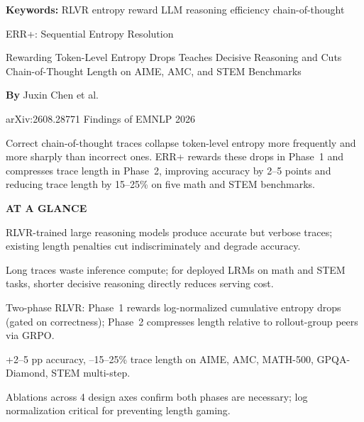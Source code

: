 \documentclass[10pt,twocolumn]{article}
\begin{document}
\setlength{\parindent}{0pt}
\setlength{\parskip}{4pt}

{\small\color{keywordgray}\textbf{Keywords:}
  RLVR \textbullet{}
  entropy reward \textbullet{}
  LLM reasoning efficiency \textbullet{}
  chain-of-thought}\par\vspace{4pt}

{\LARGE\bfseries\raggedright
  ERR{+}: Sequential Entropy Resolution}\par\vspace{4pt}

{\large\itshape\raggedright
  Rewarding Token-Level Entropy Drops Teaches Decisive Reasoning and
  Cuts Chain-of-Thought Length on AIME, AMC, and STEM Benchmarks}\par\vspace{6pt}

{\small\textbf{By} Juxin Chen et al.}\par\vspace{2pt}

{\small\color{keywordgray}arXiv:2608.28771 \textbullet{} Findings of EMNLP 2026}
\par\vspace{2pt}\noindent{\color{rulered}\rule{\columnwidth}{0.6pt}}\vspace{6pt}

Correct chain-of-thought traces collapse token-level entropy more
frequently and more sharply than incorrect ones. ERR+ rewards these drops
in Phase~1 and compresses trace length in Phase~2, improving accuracy by
2--5 points and reducing trace length by 15--25\% on five math and STEM
benchmarks.

\begin{mdframed}[backgroundcolor=boxgray,linecolor=rulered,linewidth=1pt,
    innerleftmargin=6pt,innerrightmargin=6pt,
    innertopmargin=6pt,innerbottommargin=6pt]
\textbf{\small AT A GLANCE}\par\vspace{4pt}
\begin{description}[leftmargin=0pt,labelsep=4pt,itemsep=2pt,parsep=0pt,
    font=\small\bfseries]
  \item[Problem:] RLVR-trained large reasoning models produce accurate but
    verbose traces; existing length penalties cut indiscriminately and
    degrade accuracy.
  \item[Why it matters:] Long traces waste inference compute; for deployed
    LRMs on math and STEM tasks, shorter decisive reasoning directly reduces
    serving cost.
  \item[Method:] Two-phase RLVR: Phase~1 rewards log-normalized cumulative
    entropy drops (gated on correctness); Phase~2 compresses length
    relative to rollout-group peers via GRPO.
  \item[Result:] +2--5 pp accuracy, --15--25\% trace length on AIME,
    AMC, MATH-500, GPQA-Diamond, STEM multi-step.
  \item[Evidence:] Ablations across 4 design axes confirm both phases
    are necessary; log normalization critical for preventing length gaming.
\end{description}
\end{mdframed}
\end{document}
